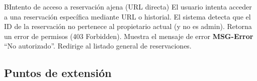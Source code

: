 \begin{UCtrayectoriaA}{B}{Intento de acceso a reservación ajena (URL directa)}
    \UCpaso El usuario intenta acceder a una reservación específica mediante URL o historial.
    \UCpaso El sistema detecta que el ID de la reservación no pertenece al propietario actual (y no es admin).
    \UCpaso Retorna un error de permisos (403 Forbidden).
    \UCpaso Muestra el mensaje de error {\bf MSG-Error} ``No autorizado''.
    \UCpaso Redirige al listado general de reservaciones.
\end{UCtrayectoriaA}

\subsection{Puntos de extensión}
